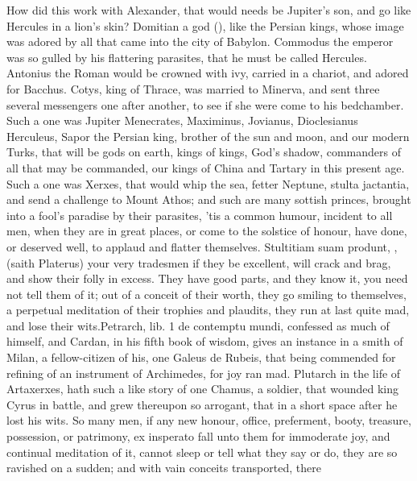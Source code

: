 {How did this work with Alexander, that would needs be Jupiter's son,
and go like Hercules in a lion's skin? Domitian a god (), like the Persian kings, whose image
was adored by all that came into the city of Babylon. Commodus the
emperor was so gulled by his flattering parasites, that he must be
called Hercules. Antonius the Roman would be crowned with ivy,
carried in a chariot, and adored for Bacchus. Cotys, king of Thrace,
was married to  Minerva, and sent three several messengers one
after another, to see if she were come to his bedchamber. Such a one
was Jupiter Menecrates, Maximinus, Jovianus, Dioclesianus
Herculeus, Sapor the Persian king, brother of the sun and moon, and our
modern Turks, that will be gods on earth, kings of kings, God's shadow,
commanders of all that may be commanded, our kings of China and Tartary
in this present age. Such a one was Xerxes, that would whip the sea,
fetter Neptune, stulta jactantia, and send a challenge to Mount Athos;
and such are many sottish princes, brought into a fool's paradise by
their parasites, 'tis a common humour, incident to all men, when they
are in great places, or come to the solstice of honour, have done, or
deserved well, to applaud and flatter themselves. Stultitiam suam
produnt, \etc{}, (saith Platerus) your very tradesmen if they be
excellent, will crack and brag, and show their folly in excess. They
have good parts, and they know it, you need not tell them of it; out of
a conceit of their worth, they go smiling to themselves, a perpetual
meditation of their trophies and plaudits, they run at last quite mad,
and lose their wits.Petrarch, lib. 1 de contemptu mundi,
confessed as much of himself, and Cardan, in his fifth book of wisdom,
gives an instance in a smith of Milan, a fellow-citizen of his,
one Galeus de Rubeis, that being commended for refining of an
instrument of Archimedes, for joy ran mad. Plutarch in the life of
Artaxerxes, hath such a like story of one Chamus, a soldier, that
wounded king Cyrus in battle, and grew thereupon so arrogant,
that in a short space after he lost his wits. So many men, if any new
honour, office, preferment, booty, treasure, possession, or patrimony,
ex insperato fall unto them for immoderate joy, and continual
meditation of it, cannot sleep or tell what they say or do, they
are so ravished on a sudden; and with vain conceits transported, there
}
